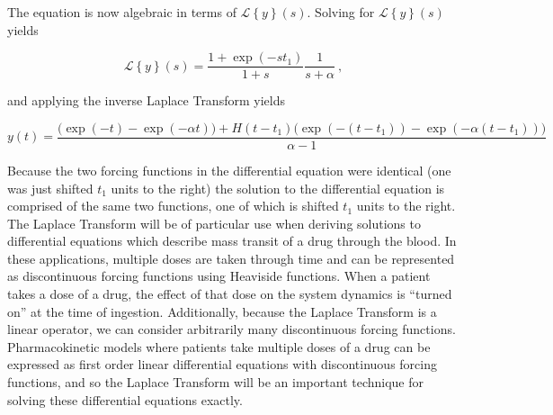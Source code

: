 \noindent The equation is now algebraic in terms of $\mathcal{L}\left\{y\right\}(s)$.  Solving for $\mathcal{L}\left\{y\right\}(s)$ yields

\begin{equation}
	\mathcal{L}\left\{y\right\}(s) =  \dfrac{1 + \exp(-st_1)}{1+s} \dfrac{1}{s+\alpha} \>,
\end{equation}

\noindent and applying the inverse Laplace Transform yields

\begin{equation}
	y(t) = \dfrac{\Big(\exp(-t) - \exp(-\alpha t)\Big) + H(t-t_1)\Big(\exp(-(t-t_1)) - \exp(-\alpha(t-t_1))\Big)}{\alpha-1}
\end{equation}

\noindent  Because the two forcing functions in the differential equation were identical (one was just shifted $t_1$ units to the right) the solution to the differential equation is comprised of the same two functions, one of which is shifted $t_1$ units to the right.  The Laplace Transform will be of particular use when deriving solutions to differential equations which describe mass transit of a drug through the blood.  In these applications, multiple doses are taken through time and can be represented as discontinuous forcing functions using Heaviside functions.  When a patient takes a dose of a drug, the effect of that dose on the system dynamics is ``turned on'' at the time of ingestion. Additionally, because the Laplace Transform is a linear operator, we can consider arbitrarily many discontinuous forcing functions. Pharmacokinetic models where patients take multiple doses of a drug can be expressed as first order linear differential equations with discontinuous forcing functions, and so the Laplace Transform will be an important technique for solving these differential equations exactly.